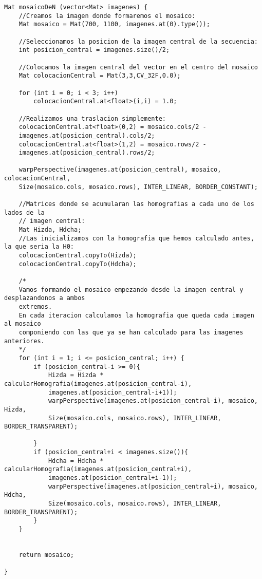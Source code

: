 \documentclass[10pt,a4paper]{article}
\begin{document}
\begin{lstlisting}
Mat mosaicoDeN (vector<Mat> imagenes) {
	//Creamos la imagen donde formaremos el mosaico:
	Mat mosaico = Mat(700, 1100, imagenes.at(0).type());
	
	//Seleccionamos la posicion de la imagen central de la secuencia:
	int posicion_central = imagenes.size()/2;
	
	//Colocamos la imagen central del vector en el centro del mosaico
	Mat colocacionCentral = Mat(3,3,CV_32F,0.0);
	
	for (int i = 0; i < 3; i++)
		colocacionCentral.at<float>(i,i) = 1.0;
		
	//Realizamos una traslacion simplemente:
	colocacionCentral.at<float>(0,2) = mosaico.cols/2 - 
	imagenes.at(posicion_central).cols/2;
	colocacionCentral.at<float>(1,2) = mosaico.rows/2 - 
	imagenes.at(posicion_central).rows/2;
	
	warpPerspective(imagenes.at(posicion_central), mosaico, colocacionCentral, 
	Size(mosaico.cols, mosaico.rows), INTER_LINEAR, BORDER_CONSTANT);
	
	//Matrices donde se acumularan las homografias a cada uno de los lados de la
	// imagen central:
	Mat Hizda, Hdcha;
	//Las inicializamos con la homografia que hemos calculado antes, la que seria la H0:
	colocacionCentral.copyTo(Hizda);
	colocacionCentral.copyTo(Hdcha);
	
	/*
	Vamos formando el mosaico empezando desde la imagen central y desplazandonos a ambos
	extremos.
	En cada iteracion calculamos la homografia que queda cada imagen al mosaico
	componiendo con las que ya se han calculado para las imagenes anteriores.	
	*/
	for (int i = 1; i <= posicion_central; i++) {
		if (posicion_central-i >= 0){
			Hizda = Hizda * calcularHomografia(imagenes.at(posicion_central-i),
			imagenes.at(posicion_central-i+1));
			warpPerspective(imagenes.at(posicion_central-i), mosaico, Hizda, 
			Size(mosaico.cols, mosaico.rows), INTER_LINEAR, BORDER_TRANSPARENT);
			
		}
		if (posicion_central+i < imagenes.size()){
			Hdcha = Hdcha * calcularHomografia(imagenes.at(posicion_central+i),
			imagenes.at(posicion_central+i-1));
			warpPerspective(imagenes.at(posicion_central+i), mosaico, Hdcha, 
			Size(mosaico.cols, mosaico.rows), INTER_LINEAR, BORDER_TRANSPARENT);
		}
	}
	
	
	return mosaico;

}

\end{lstlisting}
\end{document}
